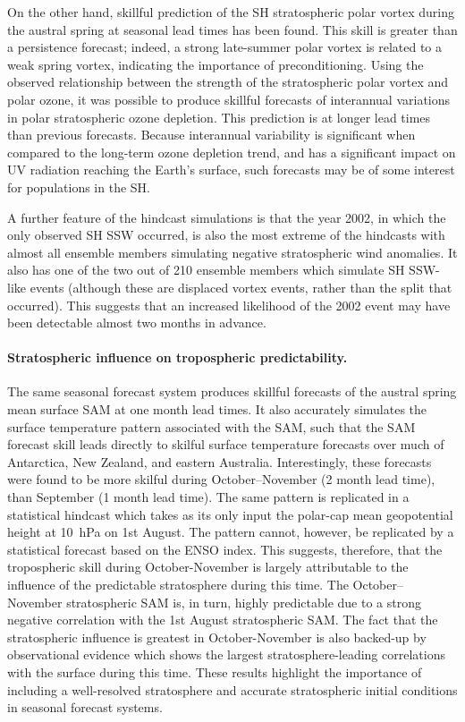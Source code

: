 On the other hand, skillful prediction of the SH stratospheric polar vortex
during the austral spring at seasonal lead times has been found. This skill is
greater than a persistence forecast; indeed, a strong late-summer polar vortex
is related to a weak spring vortex, indicating the importance of
preconditioning. Using the observed relationship between the strength of the
stratospheric polar vortex and polar ozone, it was possible to produce skillful
forecasts of interannual variations in polar stratospheric ozone depletion. This
prediction is at longer lead times than previous forecasts. Because interannual
variability is significant when compared to the long-term ozone depletion trend,
and has a significant impact on UV radiation reaching the Earth's surface, such
forecasts may be of some interest for populations in the SH.

A further feature of the hindcast simulations is that the year 2002, in which
the only observed SH SSW occurred, is also the most extreme of the hindcasts
with almost all ensemble members simulating negative stratospheric wind
anomalies. It also has one of the two out of 210 ensemble members which simulate
SH SSW-like events (although these are displaced vortex events, rather than the
split that occurred). This suggests that an increased likelihood of the 2002
event may have been detectable almost two months in advance.

\paragraph{Stratospheric influence on tropospheric predictability.} The same
seasonal forecast system produces skillful forecasts of the austral spring mean
surface SAM at one month lead times. It also accurately simulates the surface
temperature pattern associated with the SAM, such that the SAM forecast skill
leads directly to skilful surface temperature forecasts over much of Antarctica,
New Zealand, and eastern Australia. Interestingly, these forecasts were found to
be more skilful during October--November (2 month lead time), than September (1
month lead time). The same pattern is replicated in a statistical hindcast which
takes as its only input the polar-cap mean geopotential height at 10~hPa on 1st
August. The pattern cannot, however, be replicated by a statistical forecast
based on the ENSO index. This suggests, therefore, that the tropospheric skill
during October-November is largely attributable to the influence of the
predictable stratosphere during this time. The October--November stratospheric
SAM is, in turn, highly predictable due to a strong negative correlation with
the 1st August stratospheric SAM. The fact that the stratospheric influence is
greatest in October-November is also backed-up by observational evidence which
shows the largest stratosphere-leading correlations with the surface during this
time. These results highlight the importance of including a well-resolved
stratosphere and accurate stratospheric initial conditions in seasonal forecast
systems.


